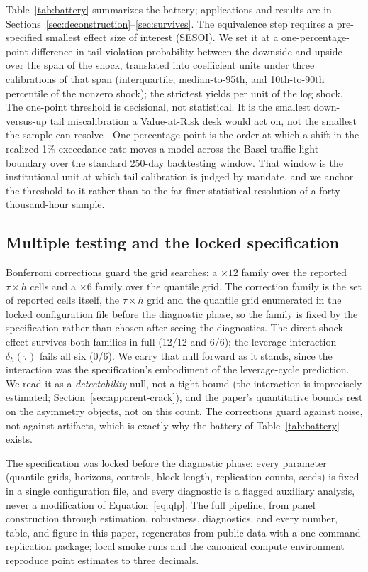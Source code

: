Table~\ref{tab:battery} summarizes the battery; applications and results
are in Sections~\ref{sec:deconstruction}--\ref{sec:survives}. The
equivalence step requires a pre-specified smallest effect size of interest
(SESOI). We set it at a one-percentage-point difference in tail-violation
probability between the downside and upside over the span of the shock,
translated into coefficient units under three calibrations of that span
(interquartile, median-to-95th, and 10th-to-90th percentile of the nonzero
shock); the strictest yields \SesoiStrict{} per unit of the log shock. The
one-point threshold is decisional, not statistical. It is the smallest
down-versus-up tail miscalibration a Value-at-Risk desk would act on, not the
smallest the sample can resolve \citep{lakens2017}. One percentage point is
the order at which a shift in the realized 1\% exceedance rate moves a model
across the Basel traffic-light boundary over the standard 250-day backtesting
window. That window is the institutional unit at which tail calibration is
judged by mandate, and we anchor the threshold to it rather than to the far
finer statistical resolution of a forty-thousand-hour sample.

\subsection{Multiple testing and the locked specification}

Bonferroni corrections guard the grid searches: a $\times 12$ family over
the reported $\tau \times h$ cells and a $\times 6$ family over the
quantile grid. The correction family is the set of reported cells itself, the
$\tau \times h$ grid and the quantile grid enumerated in the locked
configuration file before the diagnostic phase, so the family is fixed by the
specification rather than chosen after seeing the diagnostics. The direct shock effect survives both families in full
(12/12 and 6/6); the leverage interaction $\delta_h(\tau)$ fails all six
(0/6). We carry that null forward as it stands, since the interaction was the
specification's embodiment of the leverage-cycle prediction. We read it as a
\emph{detectability} null, not a tight bound (the interaction is imprecisely
estimated; Section~\ref{sec:apparent-crack}), and the paper's quantitative
bounds rest on the asymmetry objects, not on this count. The
corrections guard against noise, not against artifacts, which is exactly why
the battery of Table~\ref{tab:battery} exists.

The specification was locked before the diagnostic phase: every parameter
(quantile grids, horizons, controls, block length, replication counts,
seeds) is fixed in a single configuration file, and every diagnostic is a
flagged auxiliary analysis, never a modification of
Equation~\eqref{eq:qlp}. The full pipeline, from panel construction through
estimation, robustness, diagnostics, and every number, table, and figure in
this paper, regenerates from public data with a one-command replication
package; local smoke runs and the canonical compute environment reproduce
point estimates to three decimals.